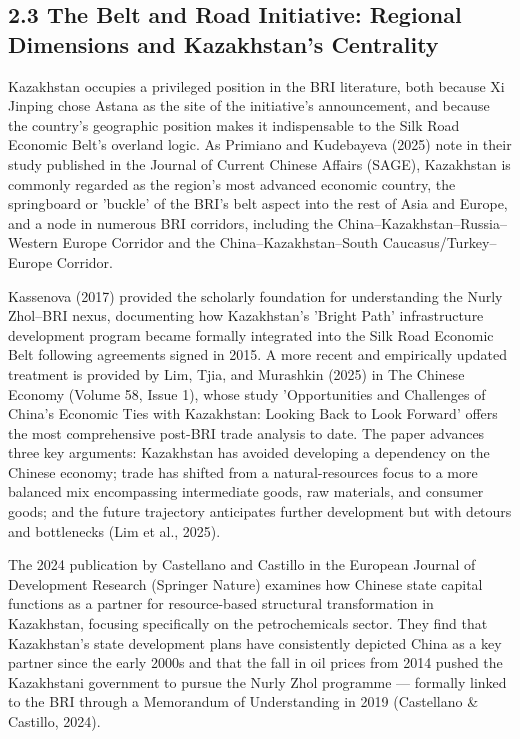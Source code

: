 \documentclass[12pt]{article}
\begin{document}
\subsection{2.3 The Belt and Road Initiative: Regional Dimensions and Kazakhstan's Centrality}
Kazakhstan occupies a privileged position in the BRI literature, both because Xi Jinping chose Astana as the site of the initiative's announcement, and because the country's geographic position makes it indispensable to the Silk Road Economic Belt's overland logic. As Primiano and Kudebayeva (2025) note in their study published in the Journal of Current Chinese Affairs (SAGE), Kazakhstan is commonly regarded as the region's most advanced economic country, the springboard or 'buckle' of the BRI's belt aspect into the rest of Asia and Europe, and a node in numerous BRI corridors, including the China--Kazakhstan--Russia--Western Europe Corridor and the China--Kazakhstan--South Caucasus/Turkey--Europe Corridor.\par
Kassenova (2017) provided the scholarly foundation for understanding the Nurly Zhol--BRI nexus, documenting how Kazakhstan's 'Bright Path' infrastructure development program became formally integrated into the Silk Road Economic Belt following agreements signed in 2015. A more recent and empirically updated treatment is provided by Lim, Tjia, and Murashkin (2025) in The Chinese Economy (Volume 58, Issue 1), whose study 'Opportunities and Challenges of China's Economic Ties with Kazakhstan: Looking Back to Look Forward' offers the most comprehensive post-BRI trade analysis to date. The paper advances three key arguments: Kazakhstan has avoided developing a dependency on the Chinese economy; trade has shifted from a natural-resources focus to a more balanced mix encompassing intermediate goods, raw materials, and consumer goods; and the future trajectory anticipates further development but with detours and bottlenecks (Lim et al., 2025).\par
The 2024 publication by Castellano and Castillo in the European Journal of Development Research (Springer Nature) examines how Chinese state capital functions as a partner for resource-based structural transformation in Kazakhstan, focusing specifically on the petrochemicals sector. They find that Kazakhstan's state development plans have consistently depicted China as a key partner since the early 2000s and that the fall in oil prices from 2014 pushed the Kazakhstani government to pursue the Nurly Zhol programme --- formally linked to the BRI through a Memorandum of Understanding in 2019 (Castellano \& Castillo, 2024).\par
\end{document}
